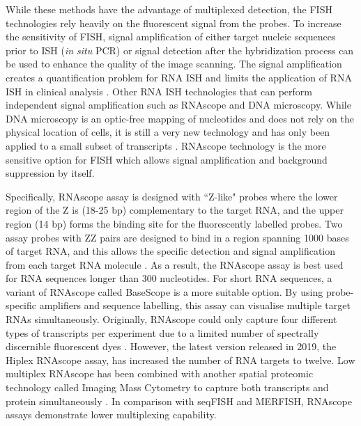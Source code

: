 While these methods have the advantage of multiplexed detection, the FISH technologies rely heavily on the fluorescent signal from the probes. To increase the sensitivity of FISH, signal amplification of either target nucleic sequences prior to ISH (\ie \textit{in situ} PCR) or signal detection after the hybridization process \cite{qian2003recent} can be used to enhance the quality of the image scanning. The signal amplification creates a quantification problem for RNA ISH and limits the application of RNA ISH in clinical analysis \cite{levsky2003fluorescence,wang2012rnascope}. Other RNA ISH technologies that can perform independent signal amplification such as RNAscope and DNA microscopy. While DNA microscopy is an optic-free mapping of nucleotides and does not rely on the physical location of cells, it is still a very new technology and has only been applied to a small subset of transcripts \cite{asp2020spatially,weinstein2019dna}. RNAscope technology is the more sensitive option for FISH which allows signal amplification and background suppression by itself.

Specifically, RNAscope assay is designed with ``Z-like" probes where the lower region of the Z is (18-25 bp) complementary to the target RNA, and the upper region (14 bp) forms the binding site for the fluorescently labelled probes. Two assay probes with ZZ pairs are designed to bind in a region spanning 1000 bases of target RNA, and this allows the specific detection and signal amplification from each target RNA molecule \cite{solanki2020visualization}. As a result, the RNAscope assay is best used for RNA sequences longer than 300 nucleotides. For short RNA sequences, a variant of RNAscope called BaseScope is a more suitable option. By using probe-specific amplifiers and sequence labelling, this assay can visualise multiple target RNAs simultaneously. Originally, RNAscope could only capture four different types of transcripts per experiment due to a limited number of spectrally discernible fluorescent dyes \cite{wang2012rnascope}. However, the latest version released in 2019, the Hiplex RNAscope assay, has increased the number of RNA targets to twelve. Low multiplex RNAscope has been combined with another spatial proteomic technology called Imaging Mass Cytometry to capture both transcripts and protein simultaneously \cite{schulz2018simultaneous}. In comparison with seqFISH and MERFISH, RNAscope assays demonstrate lower multiplexing capability. 

